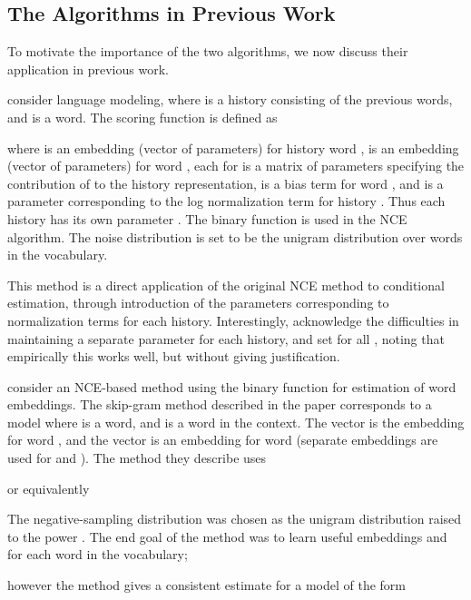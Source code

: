 \documentclass[11pt,a4paper]{article}
\newcommand{\commentout}[1]{}
\begin{document}
 
\subsection{The Algorithms in Previous Work}

\label{related}

To motivate the importance of the two algorithms, we
now discuss their application in previous work.

\citet{mnih2012fast} consider language modeling, where  is a history consisting of the previous  words,
and  is a word. The scoring function is defined as

where  is an embedding (vector of parameters) for history
word ,  is an embedding (vector of parameters) for word ,
each  for  is a matrix of parameters specifying
the contribution of  to the history representation,  is
a bias term for word , and  is a parameter corresponding to
the log normalization term for history . Thus each history  has
its own parameter . The binary  function is used in the NCE
algorithm. The noise distribution  is set to be the unigram
distribution over words in the vocabulary.

This method is a direct application of the original NCE method
to conditional estimation, through introduction of the parameters
 corresponding to normalization terms for each history. Interestingly,
\citet{mnih2012fast} acknowledge the difficulties in maintaining a
separate parameter  for each history, and set  for all ,
noting that empirically this works well, but without giving justification.




\citet{Mikolov:2013} 
consider an NCE-based method using the binary
 function for estimation of word embeddings. The skip-gram method
described in the paper corresponds to a model where  is a word, and
 is a word in the context. The vector  is the embedding for
word , and the vector  is an embedding for word  (separate
embeddings are used for  and ). The method they describe uses 

or equivalently

The negative-sampling distribution  was chosen as the unigram distribution
 raised to the power . The end goal of the method was to learn
useful embeddings  and  for each word in the vocabulary; 
\commentout{however assuming that Assumption~\ref{assump:binary} holds, the method gives a consistent
estimate for a model of the form

where  does not vary with . }
however the method gives a consistent
estimate for a model of the form
\end{document}
